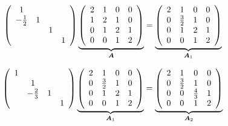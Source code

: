 \begin{small}
\begin{jie}
  $$
   \left(
  \begin{array}{cccc}
  1 & && \\
  -\frac12 &1&&\\
  &&1&\\
  &&&1
  \end{array}
  \right)\underbrace{\left(
  \begin{array}{cccc}
  2 & 1 & 0 & 0\\
  1 & 2 & 1 & 0\\
  0 & 1 & 2 & 1\\
  0 & 0 & 1 & 2
  \end{array}
  \right)}_{\boldsymbol{A}}=  \underbrace{\left(
  \begin{array}{cccc}
  2 & 1 & 0 & 0\\
  0 & \frac32 & 1 & 0\\
  0 & 1 & 2 & 1\\
  0 & 0 & 1 & 2
  \end{array}
  \right)}_{\boldsymbol{A}_1}
  $$

  $$
  \left(
    \begin{array}{cccc}
      1 & && \\
        &1&&\\
        &-\frac23&1&\\
        &&&1
    \end{array}
  \right)\underbrace{\left(
        \begin{array}{cccc}
        2 & 1 & 0 & 0\\
        0 & \frac32 & 1 & 0\\
        0 & 1 & 2 & 1\\
        0 & 0 & 1 & 2
        \end{array}
        \right)}_{\boldsymbol{A}_1} = \underbrace{\left(
    \begin{array}{cccc}
      2 & 1 & 0 & 0\\
      0 & \frac32 & 1 & 0\\
      0 & 0 & \frac43 & 1\\
      0 & 0 & 1 & 2
    \end{array}
  \right)}_{\boldsymbol{A}_2}
  $$



\end{jie}
\end{small}
